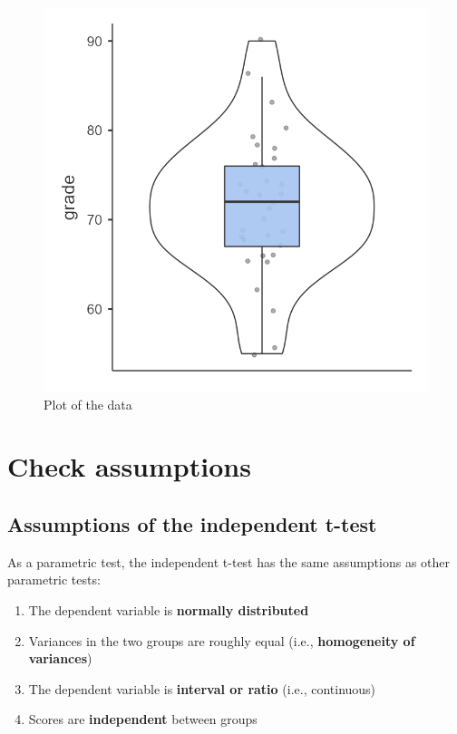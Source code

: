 \documentclass[
]{book}
\begin{document}
\begin{figure}

{\centering \includegraphics[width=0.8\linewidth]{images/02-independent_t-test/independent_t-test_plot_all} 

}

\caption{Plot of the data}\label{fig:unnamed-chunk-3}
\end{figure}

\hypertarget{check-assumptions}{%
\section{Check assumptions}\label{check-assumptions}}

\hypertarget{assumptions-of-the-independent-t-test}{%
\subsection{Assumptions of the independent t-test}\label{assumptions-of-the-independent-t-test}}

As a parametric test, the independent t-test has the same assumptions as other parametric tests:

\begin{enumerate}
\def\labelenumi{\arabic{enumi}.}
\item
  The dependent variable is \textbf{normally distributed}
\item
  Variances in the two groups are roughly equal (i.e., \textbf{homogeneity of variances})
\item
  The dependent variable is \textbf{interval or ratio} (i.e., continuous)
\item
  Scores are \textbf{independent} between groups
\end{enumerate}
\end{document}

